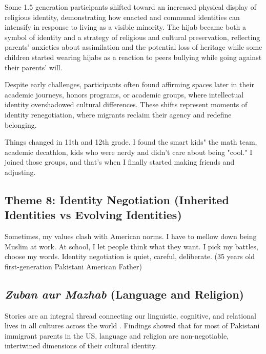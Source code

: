Some 1.5 generation participants shifted toward an increased physical display of religious identity, demonstrating how enacted and communal identities can intensify in response to living as a visible minority. The hijab became both a symbol of identity and a strategy of religious and cultural preservation, reflecting parents’ anxieties about assimilation and the potential loss of heritage while some children started wearing hijabs as a reaction to peers bullying while going against their parents' will.

Despite early challenges, participants often found affirming spaces later in their academic journeys, honors programs, or academic groups, where intellectual identity overshadowed cultural differences. These shifts represent moments of identity renegotiation, where migrants reclaim their agency and redefine belonging.

\begin{FoundPoem}
Things changed in 11th and 12th grade. 
I found the smart kids"
the math team, 
academic decathlon, 
kids who were nerdy 
and didn’t care about being "cool."
I joined those groups, and that’s when I finally started making friends 
and adjusting.
\end{FoundPoem}

\subsection{Theme 8: Identity Negotiation (Inherited Identities vs Evolving Identities)}

\begin{FoundPoem}
Sometimes, my values clash with American norms.
I have to mellow down being Muslim at work.
At school, I let people think what they want.
I pick my battles, choose my words.
Identity negotiation is quiet, careful, deliberate.
(35 years old first-generation Pakistani American Father)
\end{FoundPoem}

\subsection{\textit{Zuban aur Mazhab} (Language and Religion)}

Stories are an integral thread connecting our linguistic, cognitive, and relational lives in all cultures across the world \citep{koenigkellasFamilyStoriesStorytelling2012}. Findings showed that for most of Pakistani immigrant parents in the US, language and religion are non-negotiable, intertwined dimensions of their cultural identity. 

